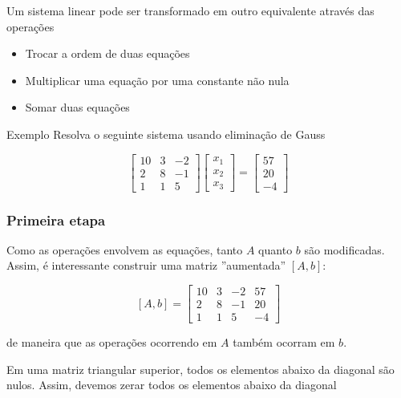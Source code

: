 \begin{frame}
    Um sistema linear pode ser transformado em outro equivalente através das operações
    \begin{itemize}
        \item Trocar a ordem de duas equações
        \item Multiplicar uma equação por uma constante não nula
        \item Somar duas equações
    \end{itemize}

    \begin{block}
        {Exemplo}
        Resolva o seguinte sistema usando eliminação de Gauss

        \[
            \begin{bmatrix}
                10 & 3 & -2 \\ 2 & 8 & -1 \\ 1 & 1 & 5
            \end{bmatrix}
            \begin{bmatrix}
                x_1 \\ x_2 \\ x_3
            \end{bmatrix}
            =
            \begin{bmatrix}
                57 \\ 20 \\ -4
            \end{bmatrix}
        \]

    \end{block}
\end{frame}

\begin{frame}
    \frametitle{Primeira etapa}
    Como as operações envolvem as equações, tanto \(A\) quanto \(b\) são modificadas. Assim, é interessante construir uma matriz ''aumentada'' \([A,b]\):

    \[
        [A,b] =
        \left[
            \begin{array}{ccc|c}
                10 & 3 & -2 & 57 \\ 2 & 8 & -1 & 20 \\ 1 & 1 & 5 & -4
            \end{array}
        \right]
    \]

    de maneira que as operações ocorrendo em \(A\) também ocorram em \(b\).

    \begin{block}
        {}
        Em uma matriz triangular superior, todos os elementos abaixo da diagonal são nulos. Assim, devemos zerar todos os elementos abaixo da diagonal
    \end{block}

\end{frame}

